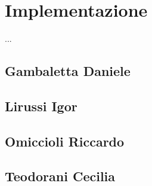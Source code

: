 
\chapter{Implementazione}
...
    \section{Gambaletta Daniele}
    \section{Lirussi Igor}
    \section{Omiccioli Riccardo}
    \section{Teodorani Cecilia}